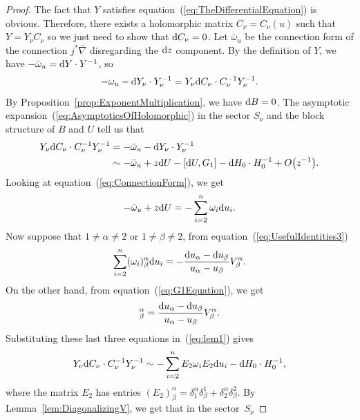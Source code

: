 \documentclass[pdftex]{sigma}
\numberwithin{equation}{section}
\begin{document}
\begin{proof}
 The fact that $Y$ satisfies equation~(\ref{eq:TheDifferentialEquation}) is obvious. Therefore, there exists a holomorphic matrix $C_{\nu}=C_{\nu}(u)$ such that $Y=Y_{\nu}C_{\nu}$ so we just need to show that ${\rm d}C_{\nu}=0$. Let $\bar{\omega}_{u}$ be the connection form of the connection $j^{*}\bar{\nabla}$ disregarding the ${\rm d}z$ component. By the definition of $Y$, we have $-\bar{\omega}_{u}={\rm d}Y\cdot Y^{-1}$, so
 \begin{equation*}
 -\omega_{u}-{\rm d}Y_{\nu}\cdot Y_{\nu}^{-1}=Y_{\nu}{\rm d}C_{\nu}\cdot C_{\nu}^{-1}Y_{\nu}^{-1}.
 \end{equation*}
 By Proposition~\ref{prop:ExponentMultiplication}, we have ${\rm d}B=0$. The asymptotic expansion~(\ref{eq:AsymptoticsOfHolomorphic}) in the sector $S_{\nu}$ and the block structure of $B$ and $U$ tell us that
 \begin{align}
 Y_{\nu}{\rm d} C_{\nu}\cdot C_{\nu}^{-1}Y_{\nu}^{-1}& =-\bar{\omega}_{u}-{\rm d}Y_{\nu}\cdot Y_{\nu}^{-1}\nonumber\\
 & \sim-\bar{\omega}_{u} +z{\rm d}U-[{\rm d}U,G_{1}]-{\rm d}H_{0}\cdot H_{0}^{-1}+O\bigl(z^{-1}\bigr).
 \label{eq:lem1}
 \end{align}
Looking at equation~(\ref{eq:ConnectionForm}), we get
\begin{equation*}
 -\bar{\omega}_{u}+z{\rm d}U=-\sum_{i=2}^{n}\omega_{i}{\rm d}u_{i}.
\end{equation*}
Now suppose that $1\neq\alpha\neq 2$ or $1\neq\beta\neq 2$, from equation~(\ref{eq:UsefulIdentities3})
\begin{equation*}
 \sum_{i=2}^{n}(\omega_{i})^{\alpha}_{\beta}{\rm d}u_{i}=-\frac{{\rm d}u_{\alpha}-{\rm d}u_{\beta}}{u_{\alpha}-u_{\beta}}V^{\alpha}_{\beta}.
\end{equation*}
On the other hand, from equation~(\ref{eq:G1Equation}), we get
\begin{equation*}
 [{\rm d}U,G_{1}]^{\alpha}_{\beta}=\frac{{\rm d}u_{\alpha}-{\rm d}u_{\beta}}{u_{\alpha}-u_{\beta}}V^{\alpha}_{\beta}.
\end{equation*}
Substituting these last three equations in~(\ref{eq:lem1}) gives
\begin{equation*}
 Y_{\nu}{\rm d}C_{\nu}\cdot C_{\nu}^{-1}Y_{\nu}^{-1}\sim-\sum_{i=2}^{n}E_{2}\omega_{i}E_{2}{\rm d}u_{i}-{\rm d}H_{0}\cdot H_{0}^{-1},
\end{equation*}
where the matrix $E_{2}$ has entries $(E_{2})^{\alpha}_{\beta}=\delta^{\alpha}_{1}\delta^{1}_{\beta}+\delta^{\alpha}_{2}\delta^{2}_{\beta}$. By Lemma~\ref{lem:DiagonalizingV}, we get that in the sector~$S_{\nu}$

\end{proof}
\end{document}
